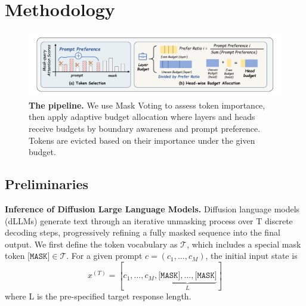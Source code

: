\section{Methodology}

\begin{figure}[t]
  \centering
  \includegraphics[width=1.0\linewidth]{figure/pipe_final.pdf}
  \caption{\textbf{The \mymethod{} pipeline.} We use Mask Voting to assess token importance, then apply adaptive budget allocation where layers and heads receive budgets by boundary awareness and prompt preference. Tokens are evicted based on their importance under the given budget.}
  \label{fig:pipline}
\end{figure}



\subsection{Preliminaries}

\noindent \textbf{Inference of Diffusion Large Language Models.}
Diffusion language models (dLLMs) generate text through an iterative unmasking process over T discrete decoding steps, progressively refining a fully masked sequence into the final output.
We first define the token vocabulary as $\mathcal{T}$, which includes a special mask token $\texttt{[MASK]} \in \mathcal{T}$.  
For a given prompt $c=(c_1,\dots,c_M)$, the initial input state is 
\begin{equation}
x^{(T)} = [c_1, \dots, c_M, \underbrace{\texttt{[MASK]}, \dots, \texttt{[MASK]}}_{L}]
\end{equation}
where L is the pre-specified target response length.


